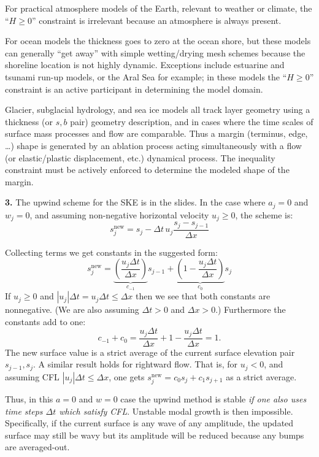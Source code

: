 \documentclass[12pt]{amsart}
\newcommand{\prob}[1]{\bigskip\noindent\textbf{#1.}\quad }
\newcommand{\snew}{s^{\text{new}}}
\begin{document}
For practical atmosphere models of the Earth, relevant to weather or climate, the ``$H\ge 0$'' constraint is irrelevant because an atmosphere is always present.

For ocean models the thickness goes to zero at the ocean shore, but these models can generally ``get away'' with simple wetting/drying mesh schemes because the shoreline location is not highly dynamic.  Exceptions include estuarine and tsunami run-up models, or the Aral Sea for example; in these models the ``$H\ge 0$'' constraint is an active participant in determining the model domain.

Glacier, subglacial hydrology, and sea ice models all track layer geometry using a thickness (or $s,b$ pair) geometry description, and in cases where the time scales of surface mass processes and flow are comparable.  Thus a margin (terminus, edge, \dots) shape is generated by an ablation process acting simultaneously with a flow (or elastic/plastic displacement, etc.) dynamical process.  The inequality constraint must be actively enforced to determine the modeled shape of the margin.


\prob{3}  The upwind scheme for the SKE is in the slides.  In the case where $a_j=0$ and $w_j=0$, and assuming non-negative horizontal velocity $u_j\ge 0$, the scheme is:
    $$\snew_j = s_j - \Delta t\, u_j \frac{s_j-s_{j-1}}{\Delta x}$$

Collecting terms we get constants in the suggested form:
	$$\snew_j = \underbrace{\left(\frac{u_j \Delta t}{\Delta x}\right)}_{c_{-1}} s_{j-1} + \underbrace{\left(1 - \frac{u_j \Delta t}{\Delta x}\right)}_{c_0} s_j$$
If $u_j\ge 0$ and $|u_j|\Delta t = u_j\Delta t\le \Delta x$ then we see that both constants are nonnegative.  (We are also assuming $\Delta t>0$ and $\Delta x > 0$.)  Furthermore the constants add to one:
	$$c_{-1} + c_0 = \frac{u_j \Delta t}{\Delta x} + 1 - \frac{u_j \Delta t}{\Delta x} = 1.$$
The new surface value is a strict average of the current surface elevation pair $s_{j-1},s_j$.  A similar result holds for rightward flow.  That is, for $u_j < 0$, and assuming CFL $|u_j|\Delta t \le \Delta x$, one gets $\snew_j = c_0 s_j + c_1 s_{j+1}$ as a strict average.

Thus, in this $a=0$ and $w=0$ case the upwind method is stable \emph{if one also uses time steps $\Delta t$ which satisfy CFL}.  Unstable modal growth is then impossible.  Specifically, if the current surface is any wave of any amplitude, the updated surface may still be wavy but its amplitude will be reduced because any bumps are averaged-out.
\end{document}
